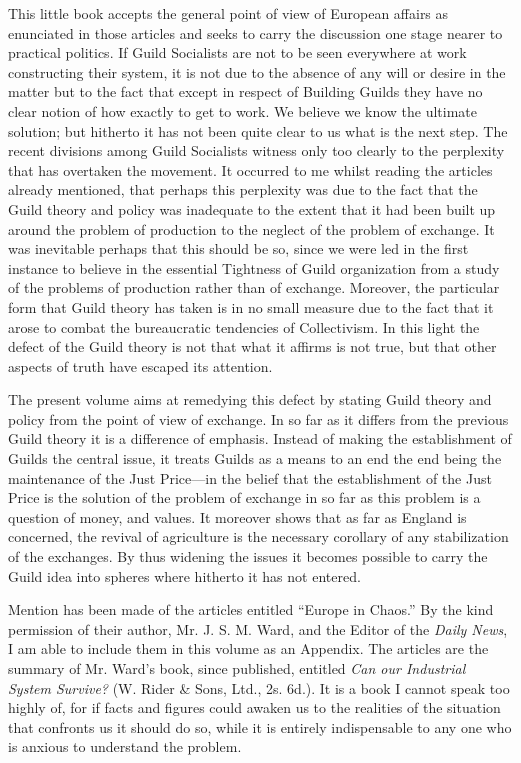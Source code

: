 \documentclass{book}
\begin{document}
This little book accepts the general point of view of European affairs as enunciated in those articles and seeks to carry the discussion one stage nearer to practical politics. If Guild Socialists are not to be seen everywhere at work constructing their system, it is not due to the absence of any will or desire in the matter but to the fact that except in respect of Building Guilds they have no clear notion of how exactly to get to work. We believe we know the ultimate solution; but hitherto it has not been quite clear to us what is the next step. The recent divisions among Guild Socialists witness only too clearly to the perplexity that has overtaken the movement. It occurred to me whilst reading the articles already mentioned, that perhaps this perplexity was due to the fact that the Guild theory and policy was inadequate to the extent that it had been built up around the problem of production to the neglect of the problem of exchange. It was inevitable perhaps that this should be so, since we were led in the first instance to believe in the essential Tightness of Guild organization from a study of the problems of production rather than of exchange. Moreover, the particular form that Guild theory has taken is in no small measure due to the fact that it arose to combat the bureaucratic tendencies of Collectivism. In this light the defect of the Guild theory is not that what it affirms is not true, but that other aspects of truth have escaped its attention.

The present volume aims at remedying this defect by stating Guild theory and policy from the point of view of exchange. In so far as it differs from the previous Guild theory it is a difference of emphasis. Instead of making the establishment of Guilds the central issue, it treats Guilds as a means to an end the end being the maintenance of the Just Price—in the belief that the establishment of the Just Price is the solution of the problem of exchange in so far as this problem is a question of money, and values. It moreover shows that as far as England is concerned, the revival of agriculture is the necessary corollary of any stabilization of the exchanges. By thus widening the issues it becomes possible to carry the Guild idea into spheres where hitherto it has not entered.

Mention has been made of the articles entitled “Europe in Chaos.” By the kind permission of their author, Mr. J. S. M. Ward, and the Editor of the \emph{Daily News}, I am able to include them in this volume as an Appendix. The articles are the summary of Mr. Ward’s book, since published, entitled \emph{Can our Industrial System Survive?} (W. Rider \& Sons, Ltd., 2s. 6d.). It is a book I cannot speak too highly of, for if facts and figures could awaken us to the realities of the situation that confronts us it should do so, while it is entirely indispensable to any one who is anxious to understand the problem.
\end{document}
